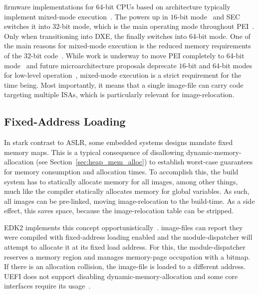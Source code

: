 \Gls{firmware} implementations for 64-bit \glspl{CPU} based on  architecture typically implement mixed-mode execution~\cite{intel-fsp}. The  powers up in $16$-bit mode~\cite{ia32} and \gls{SEC} switches it into $32$-bit mode, which is the main operating mode throughout \gls{PEI}~\cite{edk2}. Only when transitioning into \gls{DXE}, the  finally switches into 64-bit mode. One of the main reasons for mixed-mode execution is the reduced memory requirements of the $32$-bit code~\cite{mixed-mode-1,mixed-mode-2}. While work is underway to move \gls{PEI} completely to 64-bit mode~\cite{mixed-mode-1,mixed-mode-2} and future microarchitecture proposals deprecate $16$-bit and 64-bit modes for low-level operation~\cite{x86s}, mixed-mode execution is a strict requirement for the time being. Most importantly, it means that a single \gls{image-file} can carry code targeting multiple \glspl{ISA}, which is particularly relevant for \gls{image-relocation}.

\subsection{Fixed-Address Loading}
\label{sec:fixed-addr}

In stark contrast to \gls{ASLR}, some embedded systems designs mandate fixed memory maps. This is a typical consequence of disallowing \gls{dynamic-memory-allocation} (see Section~\ref{sec:heap_mem_alloc}) to establish worst-case guarantees for memory consumption and allocation times. To accomplish this, the build system has to statically allocate memory for all \glspl{image}, among other things, much like the compiler statically allocates memory for global variables. As such, all \glspl{image} can be pre-linked, moving \gls{image-relocation} to the build-time. As a side effect, this saves space, because the \gls{image-relocation} table can be stripped.

\Gls{EDK2} implements this concept opportunistically~\cite{edk2}. \Glspl{image-file} can report they were compiled with fixed-address loading enabled and the \gls{module-dispatcher} will attempt to allocate it at its fixed load address. For this, the \gls{module-dispatcher} reserves a memory region and manages \gls{memory-page} occupation with a bitmap. If there is an allocation collision, the \gls{image-file} is loaded to a different address. \Gls{UEFI} does not support disabling \gls{dynamic-memory-allocation} and some core interfaces require its usage~\cite{pi-spec,uefi-spec}.

